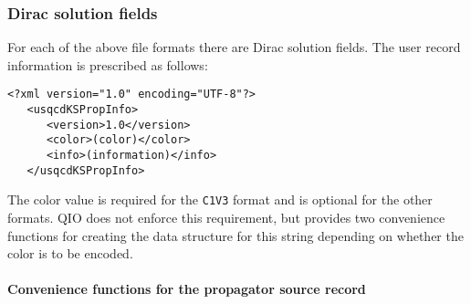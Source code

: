 \documentclass{article}
\begin{document}
\subsubsection{Dirac solution fields}

For each of the above file formats there are Dirac solution fields.
The user record information is prescribed as follows:

\begin{verbatim}
<?xml version="1.0" encoding="UTF-8"?>
   <usqcdKSPropInfo>
      <version>1.0</version>
      <color>(color)</color>
      <info>(information)</info>
   </usqcdKSPropInfo>
\end{verbatim}
%
The color value is required for the \verb|C1V3| format and is
optional for the other formats.  QIO does not enforce this
requirement, but provides two convenience functions for creating the
data structure for this string depending on whether the color
is to be encoded.

\paragraph{Convenience functions for the propagator source record}
\end{document}

